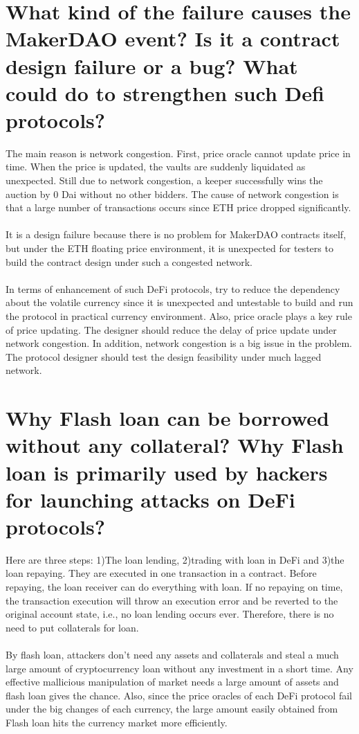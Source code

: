 \documentclass{article}
\begin{document}
\section{What kind of the failure causes the MakerDAO event? Is it a contract design
failure or a bug? What could do to strengthen such Defi protocols?}
The main reason is network congestion. 
First, price oracle cannot update price in time. 
When the price is updated, the vaults are suddenly liquidated as unexpected. 
Still due to network congestion, a keeper successfully wins the auction by 0 Dai without no other bidders. 
The cause of network congestion is that a large number of transactions occurs since ETH price dropped significantly.\\\\
It is a design failure because there is no problem for MakerDAO contracts itself,
but under the ETH floating price environment, 
it is unexpected for testers to build the contract design under such a congested network.\\\\
In terms of enhancement of such DeFi protocols, try to reduce the dependency about the volatile currency
since it is unexpected and untestable to build and run the protocol in practical currency environment.
Also, price oracle plays a key rule of price updating. The designer should reduce the delay of price update under network congestion. In addition, network congestion is a big issue in the problem. The protocol designer should test the design feasibility under much lagged network.
\section{Why Flash loan can be borrowed without any collateral? Why Flash loan is
primarily used by hackers for launching attacks on DeFi protocols?}
Here are three steps:
1)The loan lending, 2)trading with loan in DeFi 
and 3)the loan repaying. They are executed in one transaction in a contract.
Before repaying, the loan receiver can do everything with loan. 
If no repaying on time, the transaction execution will throw an execution error and be reverted to the original account state,
i.e., no loan lending occurs ever. Therefore, there is no need to put collaterals for loan.\\\\
By flash loan, attackers don't need any assets and collaterals and steal a much large amount of
cryptocurrency loan without any investment in a short time. 
Any effective mallicious manipulation of market needs a large amount of assets 
and flash loan gives the chance. 
Also, since the price oracles of each DeFi protocol fail under the big changes of each currency, the large amount easily obtained from Flash loan hits the currency market more efficiently.
\end{document}
